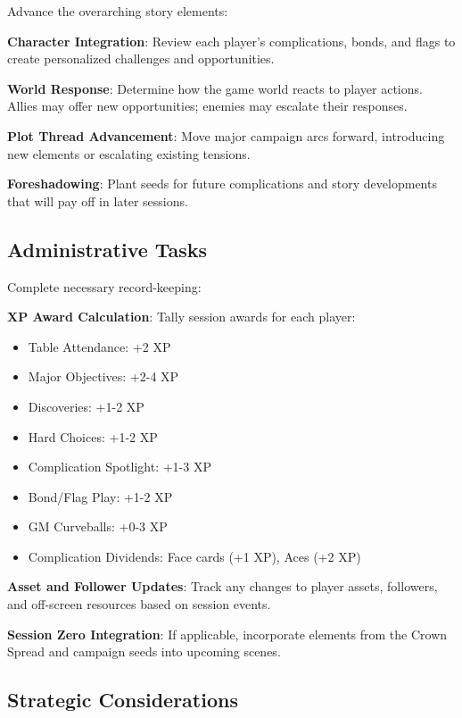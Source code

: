Advance the overarching story elements:

\textbf{Character Integration}: Review each player's complications, bonds, and flags to create personalized challenges and opportunities.

\textbf{World Response}: Determine how the game world reacts to player actions. Allies may offer new opportunities; enemies may escalate their responses.

\textbf{Plot Thread Advancement}: Move major campaign arcs forward, introducing new elements or escalating existing tensions.

\textbf{Foreshadowing}: Plant seeds for future complications and story developments that will pay off in later sessions.

\subsection*{Administrative Tasks}

Complete necessary record-keeping:

\textbf{XP Award Calculation}: Tally session awards for each player:
\begin{itemize}
    \item Table Attendance: +2 XP
    \item Major Objectives: +2-4 XP
    \item Discoveries: +1-2 XP
    \item Hard Choices: +1-2 XP
    \item Complication Spotlight: +1-3 XP
    \item Bond/Flag Play: +1-2 XP
    \item GM Curveballs: +0-3 XP
    \item Complication Dividends: Face cards (+1 XP), Aces (+2 XP)
\end{itemize}

\textbf{Asset and Follower Updates}: Track any changes to player assets, followers, and off-screen resources based on session events.

\textbf{Session Zero Integration}: If applicable, incorporate elements from the Crown Spread and campaign seeds into upcoming scenes.

\subsection*{Strategic Considerations}

